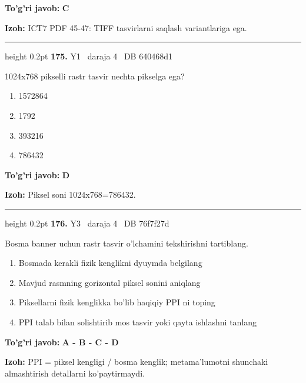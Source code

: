 \documentclass[10pt,a4paper,oneside]{article}
\begin{document}
\begin{tcolorbox}[enhanced,breakable,colback=teal!4,colframe=teal!45!black,boxrule=0.45pt,arc=1.2mm,left=2.8mm,right=2.8mm,top=2mm,bottom=2mm,before skip=2mm,after skip=2mm]
\textbf{\color{teal}To'g'ri javob:} \textbf{C}
\par\smallskip
\textbf{Izoh:} ICT7 PDF 45-47: TIFF tasvirlarni saqlash variantlariga ega.
\end{tcolorbox}
\vspace{2mm}\hrule height 0.2pt \vspace{4mm}
\hypertarget{q175}{\textbf{\color{ink}175.}}  {\color{muted}\scriptsize Y1 \textbullet\ daraja 4 \textbullet\ DB 640468d1}
\par
1024x768 pikselli rastr tasvir nechta pikselga ega?
\begin{enumerate}[label=\Alph*),leftmargin=9mm]
\item 1572864
\item 1792
\item 393216
\item 786432
\end{enumerate}
\begin{tcolorbox}[enhanced,breakable,colback=teal!4,colframe=teal!45!black,boxrule=0.45pt,arc=1.2mm,left=2.8mm,right=2.8mm,top=2mm,bottom=2mm,before skip=2mm,after skip=2mm]
\textbf{\color{teal}To'g'ri javob:} \textbf{D}
\par\smallskip
\textbf{Izoh:} Piksel soni 1024x768=786432.
\end{tcolorbox}
\vspace{2mm}\hrule height 0.2pt \vspace{4mm}
\hypertarget{q176}{\textbf{\color{ink}176.}}  {\color{muted}\scriptsize Y3 \textbullet\ daraja 4 \textbullet\ DB 76f7f27d}
\par
Bosma banner uchun rastr tasvir o'lchamini tekshirishni tartiblang.
\begin{enumerate}[label=\Alph*),leftmargin=9mm]
\item Bosmada kerakli fizik kenglikni dyuymda belgilang
\item Mavjud rasmning gorizontal piksel sonini aniqlang
\item Piksellarni fizik kenglikka bo'lib haqiqiy PPI ni toping
\item PPI talab bilan solishtirib mos tasvir yoki qayta ishlashni tanlang
\end{enumerate}
\begin{tcolorbox}[enhanced,breakable,colback=teal!4,colframe=teal!45!black,boxrule=0.45pt,arc=1.2mm,left=2.8mm,right=2.8mm,top=2mm,bottom=2mm,before skip=2mm,after skip=2mm]
\textbf{\color{teal}To'g'ri javob:} \textbf{A - B - C - D}
\par\smallskip
\textbf{Izoh:} PPI = piksel kengligi / bosma kenglik; metama'lumotni shunchaki almashtirish detallarni ko'paytirmaydi.
\end{tcolorbox}
\end{document}
